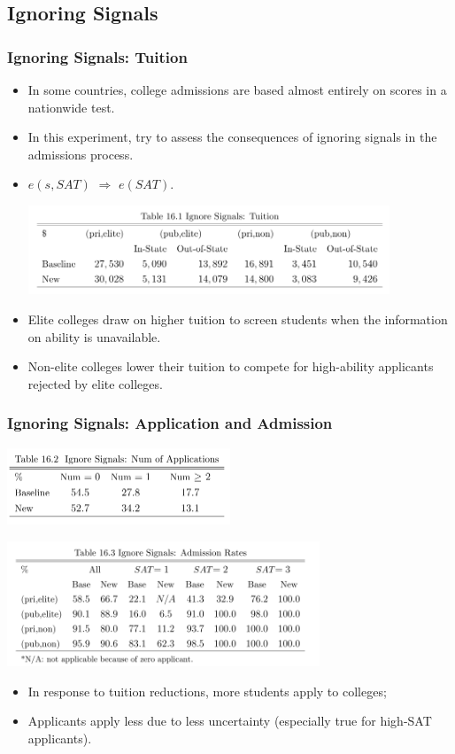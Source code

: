 \documentclass[10pt]{beamer}
\begin{document}
\subsection{Ignoring Signals}
\begin{frame}[c]\frametitle{Ignoring Signals: Tuition}
\begin{itemize}
    \item  In some countries, college admissions are based almost entirely on scores in a nationwide test.
    \item  In this experiment, try to \alert{assess the consequences of ignoring signals in the admissions process}.
    \item $e(s,SAT) $ $\Rightarrow$ $e(SAT)$.
\centerline{\includegraphics[width=0.85\textwidth]{table161.png}}
    \item Elite colleges draw on higher tuition to screen students when the information on ability is unavailable.
    \item Non-elite colleges lower their tuition to compete for high-ability applicants rejected by elite colleges.
\end{itemize}

\end{frame}

\begin{frame}[c]\frametitle{Ignoring Signals: Application and Admission}

\centerline{\includegraphics[width=0.5\textwidth]{table162.png}}
\centerline{\includegraphics[width=0.7\textwidth]{table163.png}}
\begin{itemize}
    \item In response to tuition reductions, more students apply to colleges;
    \item Applicants apply less due to less uncertainty (especially true for high-SAT applicants).
\end{itemize}

\end{frame}
\end{document}
